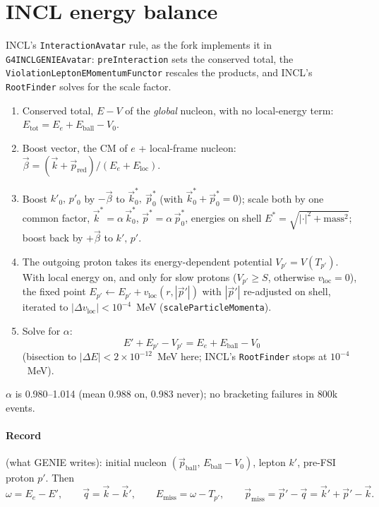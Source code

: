\documentclass[11pt]{article}
\newcommand{\vv}[1]{\vec{#1}}
\newcommand{\ball}{\mathrm{ball}}
\newcommand{\red}{\mathrm{red}}
\newcommand{\loc}{\mathrm{loc}}
\newcommand{\miss}{\mathrm{miss}}
\newcommand{\Vz}{V_0}
\newcommand{\code}[1]{\texttt{#1}}
\begin{document}
\section{INCL energy balance}

INCL's \code{InteractionAvatar} rule, as the fork implements it in
\code{G4INCLGENIEAvatar}: \code{preInteraction} sets the conserved total, the
\code{ViolationLeptonEMomentumFunctor} rescales the products, and INCL's
\code{RootFinder} solves for the scale factor.
\begin{enumerate}
\item Conserved total, $E-V$ of the \emph{global} nucleon, with no local-energy term:
  $E_{\mathrm{tot}}=E_e+E_\ball-\Vz$.
\item Boost vector, the CM of $e$ + local-frame nucleon:
  $\vv\beta=(\vv k+\vv p_\red)/(E_e+E_\loc)$.
\item Boost $k'_0,\,p'_0$ by $-\vv\beta$ to $\vv k^*_0,\ \vv p^*_0$ (with
  $\vv k^*_0+\vv p^*_0=0$); scale both by one common factor,
  $\vv k^*=\alpha\,\vv k^*_0$, $\vv p^*=\alpha\,\vv p^*_0$, energies on shell
  $E^*=\sqrt{|\cdot|^2+\text{mass}^2}$; boost back by $+\vv\beta$ to $k',\,p'$.
\item The outgoing proton takes its energy-dependent potential $V_{p'}=V(T_{p'})$.
  With local energy on, and only for slow protons ($V_{p'}\ge S$, otherwise
  $v_\loc=0$), the fixed point $E_{p'}\leftarrow E_{p'}+v_\loc(r,|\vv p'|)$ with
  $|\vv p'|$ re-adjusted on shell, iterated to $|\Delta v_\loc|<10^{-4}$~MeV
  (\code{scaleParticleMomenta}).
\item Solve for $\alpha$:
  \begin{equation*}
  E'+E_{p'}-V_{p'}=E_e+E_\ball-\Vz
  \end{equation*}
  (bisection to $|\Delta E|<2\times10^{-12}$~MeV here; INCL's \code{RootFinder}
  stops at $10^{-4}$~MeV).
\end{enumerate}
$\alpha$ is 0.980--1.014 (mean 0.988 on, 0.983 never); no bracketing failures in
800k events.

\paragraph{Record} (what GENIE writes): initial nucleon $(\vv p_\ball,\,E_\ball-\Vz)$,
lepton $k'$, pre-FSI proton $p'$. Then
\begin{equation*}
\omega=E_e-E',\qquad \vv q=\vv k-\vv k',\qquad E_\miss=\omega-T_{p'},\qquad
\vv p_\miss=\vv p'-\vv q=\vv k'+\vv p'-\vv k .
\end{equation*}
\end{document}
